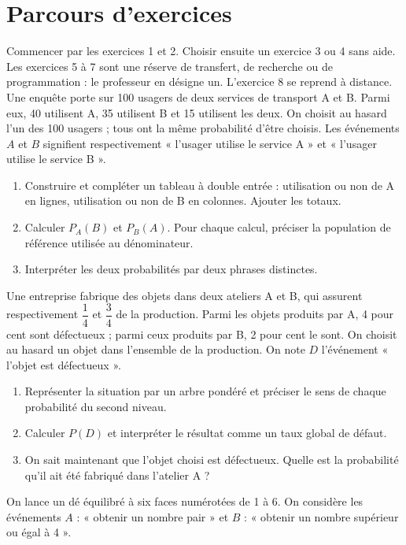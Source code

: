 \section*{Parcours d’exercices}\label{C05-PARC}
Commencer par les exercices 1 et 2. Choisir ensuite un exercice 3 ou 4 sans aide. Les exercices 5 à 7 sont une réserve de transfert, de recherche ou de programmation : le professeur en désigne un. L’exercice 8 se reprend à distance.
\begingroup
{}
Une enquête porte sur 100 usagers de deux services de transport A et B. Parmi eux, 40 utilisent A, 35 utilisent B et 15 utilisent les deux. On choisit au hasard l’un des 100 usagers ; tous ont la même probabilité d’être choisis. Les événements $A$ et $B$ signifient respectivement « l’usager utilise le service A » et « l’usager utilise le service B ».
\begin{enumerate}[label=\arabic*.]
\item Construire et compléter un tableau à double entrée : utilisation ou non de A en lignes, utilisation ou non de B en colonnes. Ajouter les totaux.
\item Calculer $P_A(B)$ et $P_B(A)$. Pour chaque calcul, préciser la population de référence utilisée au dénominateur.
\item Interpréter les deux probabilités par deux phrases distinctes.
\end{enumerate}
Une entreprise fabrique des objets dans deux ateliers A et B, qui assurent respectivement $\dfrac14$ et $\dfrac34$ de la production. Parmi les objets produits par A, 4 pour cent sont défectueux ; parmi ceux produits par B, 2 pour cent le sont. On choisit au hasard un objet dans l’ensemble de la production. On note $D$ l’événement « l’objet est défectueux ».
\begin{enumerate}[label=\arabic*.]
\item Représenter la situation par un arbre pondéré et préciser le sens de chaque probabilité du second niveau.
\item Calculer $P(D)$ et interpréter le résultat comme un taux global de défaut.
\item On sait maintenant que l’objet choisi est défectueux. Quelle est la probabilité qu’il ait été fabriqué dans l’atelier A ?
\end{enumerate}
On lance un dé équilibré à six faces numérotées de 1 à 6. On considère les événements $A$ : « obtenir un nombre pair » et $B$ : « obtenir un nombre supérieur ou égal à 4 ».
